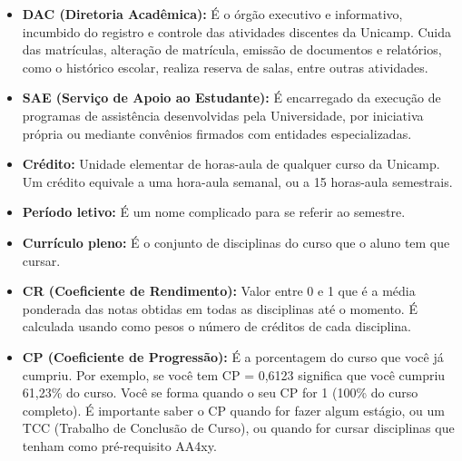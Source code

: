 \begin{itemize}
\item  \textbf{DAC (Diretoria Acadêmica):} É o órgão executivo e informativo, incumbido do registro e controle das atividades discentes da Unicamp. Cuida das matrículas, alteração de matrícula, emissão de documentos e relatórios, como o histórico escolar, realiza reserva de salas, entre outras atividades.
\end{itemize}

\begin{itemize}
\item  \textbf{SAE (Serviço de Apoio ao Estudante):} É encarregado da execução de programas de assistência desenvolvidas pela Universidade, por iniciativa própria ou mediante convênios firmados com entidades especializadas.
\end{itemize}

\begin{itemize}
\item  \textbf{Crédito:} Unidade elementar de horas-aula de qualquer curso da Unicamp. Um crédito equivale a uma hora-aula semanal, ou a 15 horas-aula semestrais.
\end{itemize}

\begin{itemize}
\item  \textbf{Período letivo:} É um nome complicado para se referir ao semestre.
\end{itemize}

\begin{itemize}
\item  \textbf{Currículo pleno:} É o conjunto de disciplinas do curso que o aluno tem que cursar.
\end{itemize}

\begin{itemize}
\item  \textbf{CR (Coeficiente de Rendimento):} Valor entre 0 e 1 que é a média ponderada das notas obtidas em todas as disciplinas até o momento. É calculada usando como pesos o número de créditos de cada disciplina.
\end{itemize}

\begin{itemize}
\item  \textbf{CP (Coeficiente de Progressão):} É a porcentagem do curso que você já cumpriu. Por exemplo, se você tem CP = 0,6123 significa que você cumpriu 61,23\% do curso. Você se forma quando o seu CP for 1 (100\% do curso completo). É importante saber o CP quando for fazer algum estágio, ou um TCC (Trabalho de Conclusão de Curso), ou quando for cursar disciplinas que tenham como pré-requisito AA4xy.
\end{itemize}

